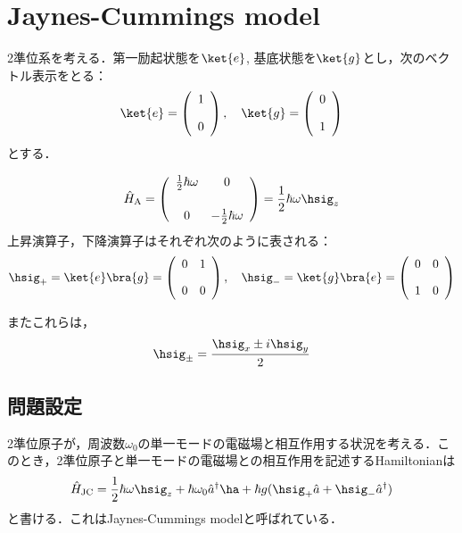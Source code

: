 \section{Jaynes-Cummings model}
2準位系を考える．第一励起状態を$\ket{e}$, 基底状態を$\ket{g}$とし，次のベクトル表示をとる：
\begin{equation}
     \ket{e}=\left(
        \begin{array}{c}
       1\\[10pt]
       0\\
        \end{array}
        \right),\ \ \ 
        \ket{g}=\left(
        \begin{array}{c}
       0\\[10pt]
       1\\
        \end{array}
        \right)
\end{equation}
とする．

\begin{equation}
     \hat{H}_{\rm{A}}=\left(
        \begin{array}{cc}
       \frac{1}{2}\hbar\omega&0\\[15pt]
       0&-\frac{1}{2}\hbar\omega\\
        \end{array}
        \right)
        =\frac{1}{2}\hbar\omega\hsig_z
\end{equation}
上昇演算子，下降演算子はそれぞれ次のように表される：
\begin{equation}
     \hsig_+=\ket{e}\bra{g}=\left(
        \begin{array}{cc}
       0&1\\[10pt]
       0&0\\
        \end{array}
        \right),\ \ \ 
        \hsig_-=\ket{g}\bra{e}=\left(
        \begin{array}{cc}
       0&0\\[10pt]
       1&0\\
        \end{array}
        \right)
\end{equation}

またこれらは，
\begin{equation}
    \hsig_{\pm}=\frac{\hsig_x\pm i\hsig_y}{2}
\end{equation}

\subsection{問題設定}
2準位原子が，周波数$\omega_0$の単一モードの電磁場と相互作用する状況を考える．このとき，2準位原子と単一モードの電磁場との相互作用を記述するHamiltonianは
\begin{equation}
    \hat{H}_{\rm{JC}}
    =\frac{1}{2}\hbar\omega\hsig_z
    +\hbar\omega_0\hat{a}^\dagger\ha
    +\hbar g(\hsig_+\hat{a}+\hsig_-\hat{a}^\dagger)
\end{equation}
と書ける．これはJaynes-Cummings modelと呼ばれている．


